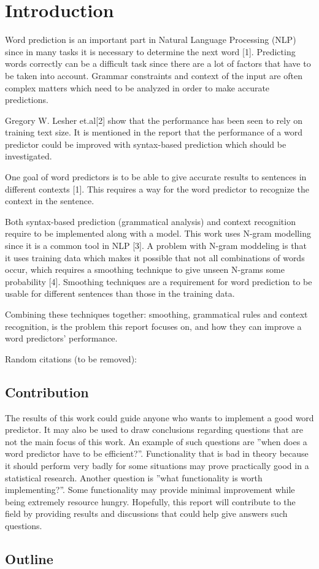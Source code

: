 \section{Introduction}
Word prediction is an important part in Natural Language Processing (NLP) since in many tasks it is necessary to determine the next word [1].  Predicting words correctly can be a difficult task since there are a lot of factors that have to be taken into account. Grammar constraints and context of the input are often complex matters which need to be analyzed in order to make accurate predictions.
 
Gregory W. Lesher et.al[2] show that the performance has been seen to rely on training text size. It is mentioned in the report that the performance of a word predictor could be improved with syntax-based prediction which should be investigated.
 
One goal of word predictors is to be able to give accurate results to sentences in different contexts [1]. This requires a way for the word predictor to recognize the context in the sentence.
 
Both syntax-based prediction (grammatical analysis) and context recognition require to be implemented along with a model. This work uses N-gram modelling since it is a common tool in NLP [3]. A problem with N-gram moddeling is that it uses training data which makes it possible that not all combinations of words occur, which requires a smoothing technique to give unseen N-grams some probability [4]. Smoothing techniques are a requirement for word prediction to be usable for different sentences than those in the training data.
 
Combining  these techniques together: smoothing, grammatical rules and context recognition, is the problem this report focuses on, and how they can improve a word predictors' performance.

Random citations (to be removed): \cite{keystrokes}\cite{smoothing}\cite{corpus}\cite{aurora}


\subsection{Contribution}
The results of this work could guide anyone who wants to implement a good word predictor. It may also be used to draw conclusions regarding questions that are not the main focus of this work. An example of such questions are ''when does a word predictor have to be efficient?''. Functionality that is bad in theory because it should perform very badly for some situations may prove practically good in a statistical research. Another question is ''what functionality is worth implementing?''. Some functionality may provide minimal improvement while being extremely resource hungry. Hopefully, this report will contribute to the field by providing results and discussions that could help give answers such questions.

\subsection{Outline}
\lipsum[1]